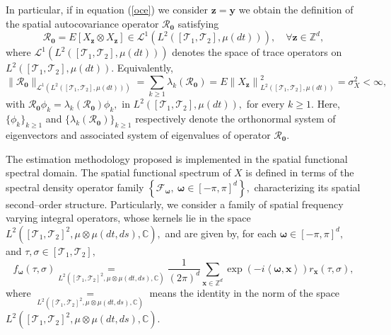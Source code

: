 \documentclass[11pt,a4paper]{article}
\begin{document}
In particular, if in equation (\ref{oce}) we consider $\mathbf{z}=\mathbf{y}$ we obtain the definition of the spatial autocovariance operator $\mathcal{R}_{\mathbf{0}}$ satisfying
$$\mathcal{R}_{\mathbf{0}}=E\left[X_{\mathbf{z}}\otimes X_{\mathbf{z}}\right]\in \mathcal{L}^{1}\left(L^{2}\left([\mathcal{T}_{1},\mathcal{T}_{2}],\mu (dt)\right)\right),\quad \forall \mathbf{z}\in \mathbb{Z}^{d},$$
\noindent  where $\mathcal{L}^{1}\left(L^{2}\left([\mathcal{T}_{1},\mathcal{T}_{2}],\mu (dt)\right)\right)$ denotes the space of trace operators on
 \linebreak $L^{2}\left([\mathcal{T}_{1},\mathcal{T}_{2}],\mu (dt)\right).$
Equivalently, $$\|\mathcal{R}_{\mathbf{0}}\|_{\mathcal{L}^{1}\left(L^{2}\left([\mathcal{T}_{1},\mathcal{T}_{2}],\mu (dt)\right)\right)}= \sum_{k\geq 1}\lambda_{k}\left(\mathcal{R}_{\mathbf{0}}\right)=E\left\|X_{\mathbf{z}}\right\|_{L^{2}\left([\mathcal{T}_{1},\mathcal{T}_{2}],\mu (dt)\right)}^{2}=\sigma_{X}^{2}<\infty,$$
\noindent with $\mathcal{R}_{\mathbf{0}}\phi_{k}=\lambda_{k}(\mathcal{R}_{\mathbf{0}})\phi_{k},$ in $L^{2}\left([\mathcal{T}_{1},\mathcal{T}_{2}],\mu (dt)\right),$  for every $k\geq 1.$ Here,   $\{\phi_{k}\}_{k\geq 1}$ and $\{\lambda_{k}(\mathcal{R}_{\mathbf{0}})\}_{k\geq 1}$ respectively denote the orthonormal system of eigenvectors and associated system of eigenvalues of operator  $\mathcal{R}_{\mathbf{0}}.$

The estimation methodology proposed is implemented in the spatial functional spectral domain. The spatial functional spectrum of $X$  is defined in terms of the spectral density operator family $\left\{\mathcal{F}_{\boldsymbol{\omega}},\ \boldsymbol{\omega}\in [-\pi,\pi]^{d}\right\},$  characterizing its spatial  second--order structure. Particularly, we consider  a family of spatial frequency varying   integral operators, whose kernels lie  in the space  $L^{2}\left([\mathcal{T}_{1},\mathcal{T}_{2}]^{2},\mu \otimes \mu(dt,ds),\mathbb{C}\right),$ and are  given by, for each $\boldsymbol{\omega }\in [-\pi,\pi]^{d},$ and $\tau,\sigma \in [\mathcal{T}_{1},\mathcal{T}_{2}],$
\begin{equation}\label{Eq1}
f_{\boldsymbol{\omega }} (\tau,\sigma) \underset{ L^{2}\left([\mathcal{T}_{1},\mathcal{T}_{2}]^{2},\mu \otimes \mu(dt,ds),\mathbb{C}\right)}{=} \frac{1}{(2\pi)^{d}} \sum_{\mathbf{x}\in\mathbb{Z}^{d}} \exp\left(-i\left\langle \boldsymbol{\omega}, \mathbf{x}\right\rangle \right)
r_{\mathbf{x}}(\tau,\sigma),
\end{equation}
\noindent where $\underset{ L^{2}\left([\mathcal{T}_{1},\mathcal{T}_{2}]^{2},\mu \otimes \mu(dt,ds),\mathbb{C}\right)}{=}$ means the identity in the norm of the space  \linebreak  $L^{2}\left([\mathcal{T}_{1},\mathcal{T}_{2}]^{2},\mu \otimes \mu(dt,ds),\mathbb{C}\right).$
\end{document}
